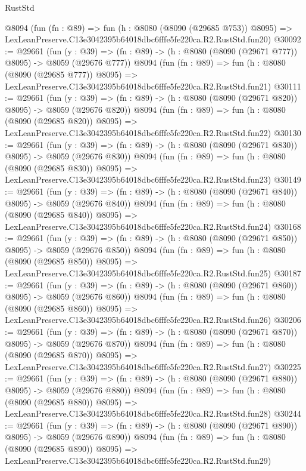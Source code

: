 \begin{lexlean}{RustStd}
\begin{coremodule}
    @8094
    (fun (fn : @89) =>
    fun (h : @8080 (@8090 (@29685 @753)) @8095) =>
    LexLeanPreserve.C13e3042395b64018dbc6fffe5fe220ca.R2.RustStd.fun20)
@30092 := @29661
    (fun (y : @39) => (fn : @89) -> (h : @8080 (@8090 (@29671 @777)) @8095) -> @8059 (@29676 @777))
    @8094
    (fun (fn : @89) =>
    fun (h : @8080 (@8090 (@29685 @777)) @8095) =>
    LexLeanPreserve.C13e3042395b64018dbc6fffe5fe220ca.R2.RustStd.fun21)
@30111 := @29661
    (fun (y : @39) => (fn : @89) -> (h : @8080 (@8090 (@29671 @820)) @8095) -> @8059 (@29676 @820))
    @8094
    (fun (fn : @89) =>
    fun (h : @8080 (@8090 (@29685 @820)) @8095) =>
    LexLeanPreserve.C13e3042395b64018dbc6fffe5fe220ca.R2.RustStd.fun22)
@30130 := @29661
    (fun (y : @39) => (fn : @89) -> (h : @8080 (@8090 (@29671 @830)) @8095) -> @8059 (@29676 @830))
    @8094
    (fun (fn : @89) =>
    fun (h : @8080 (@8090 (@29685 @830)) @8095) =>
    LexLeanPreserve.C13e3042395b64018dbc6fffe5fe220ca.R2.RustStd.fun23)
@30149 := @29661
    (fun (y : @39) => (fn : @89) -> (h : @8080 (@8090 (@29671 @840)) @8095) -> @8059 (@29676 @840))
    @8094
    (fun (fn : @89) =>
    fun (h : @8080 (@8090 (@29685 @840)) @8095) =>
    LexLeanPreserve.C13e3042395b64018dbc6fffe5fe220ca.R2.RustStd.fun24)
@30168 := @29661
    (fun (y : @39) => (fn : @89) -> (h : @8080 (@8090 (@29671 @850)) @8095) -> @8059 (@29676 @850))
    @8094
    (fun (fn : @89) =>
    fun (h : @8080 (@8090 (@29685 @850)) @8095) =>
    LexLeanPreserve.C13e3042395b64018dbc6fffe5fe220ca.R2.RustStd.fun25)
@30187 := @29661
    (fun (y : @39) => (fn : @89) -> (h : @8080 (@8090 (@29671 @860)) @8095) -> @8059 (@29676 @860))
    @8094
    (fun (fn : @89) =>
    fun (h : @8080 (@8090 (@29685 @860)) @8095) =>
    LexLeanPreserve.C13e3042395b64018dbc6fffe5fe220ca.R2.RustStd.fun26)
@30206 := @29661
    (fun (y : @39) => (fn : @89) -> (h : @8080 (@8090 (@29671 @870)) @8095) -> @8059 (@29676 @870))
    @8094
    (fun (fn : @89) =>
    fun (h : @8080 (@8090 (@29685 @870)) @8095) =>
    LexLeanPreserve.C13e3042395b64018dbc6fffe5fe220ca.R2.RustStd.fun27)
@30225 := @29661
    (fun (y : @39) => (fn : @89) -> (h : @8080 (@8090 (@29671 @880)) @8095) -> @8059 (@29676 @880))
    @8094
    (fun (fn : @89) =>
    fun (h : @8080 (@8090 (@29685 @880)) @8095) =>
    LexLeanPreserve.C13e3042395b64018dbc6fffe5fe220ca.R2.RustStd.fun28)
@30244 := @29661
    (fun (y : @39) => (fn : @89) -> (h : @8080 (@8090 (@29671 @890)) @8095) -> @8059 (@29676 @890))
    @8094
    (fun (fn : @89) =>
    fun (h : @8080 (@8090 (@29685 @890)) @8095) =>
    LexLeanPreserve.C13e3042395b64018dbc6fffe5fe220ca.R2.RustStd.fun29)

\end{coremodule}
\end{lexlean}

